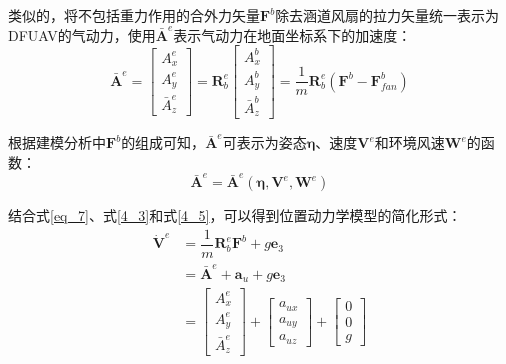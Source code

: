 类似的，将不包括重力作用的合外力矢量$\boldsymbol{F}^b$除去涵道风扇的拉力矢量统一表示为DFUAV的气动力，使用${\boldsymbol{\bar A}}^e$表示气动力在地面坐标系下的加速度：
\begin{equation}
    {\boldsymbol{\bar A}}^e=
    \begin{bmatrix}
    A_x^e \\
    A_y^e \\
    \bar{A}_z^e
    \end{bmatrix}=\boldsymbol{R}_b^e
    \begin{bmatrix}
    A_x^b \\
    A_y^b \\
    \bar{A}_z^b
    \end{bmatrix}=\frac{1}{m}\boldsymbol{R}_b^e(\boldsymbol{F}^b-\boldsymbol{F}^b_{fan})
    \label{4_4}
\end{equation}

根据建模分析中$\boldsymbol{F}^b$的组成可知，${\boldsymbol{\bar A}}^e$可表示为姿态$\boldsymbol{\eta}$、速度$\boldsymbol{V}^e$和环境风速$\boldsymbol{W}^e$的函数：
\begin{equation}
    {\boldsymbol{\bar A}}^e={\boldsymbol{\bar A}}^e(\boldsymbol{\eta},\boldsymbol{V}^e,\boldsymbol{W}^e)
    \label{4_5}
\end{equation}

结合式\eqref{eq_7}、式\eqref{4_3}和式\eqref{4_5}，可以得到位置动力学模型的简化形式：
\begin{equation}
    \begin{aligned}
        \dot{\boldsymbol{V}}^e&=\dfrac{1}{m}\boldsymbol{R}_b^e\boldsymbol{F}^b+g\boldsymbol{e}_3\\
        &={\boldsymbol{\bar A}}^e+\boldsymbol{a}_u+g\boldsymbol{e}_3\\
        &=  \begin{bmatrix}A_x^e \\A_y^e \\\bar{A}_z^e\end{bmatrix}+
        \begin{bmatrix}a_{ux} \\a_{uy} \\a_{uz}\end{bmatrix}+
        \begin{bmatrix}0 \\0 \\g\end{bmatrix}
    \end{aligned}
    \label{4_6}
\end{equation}

